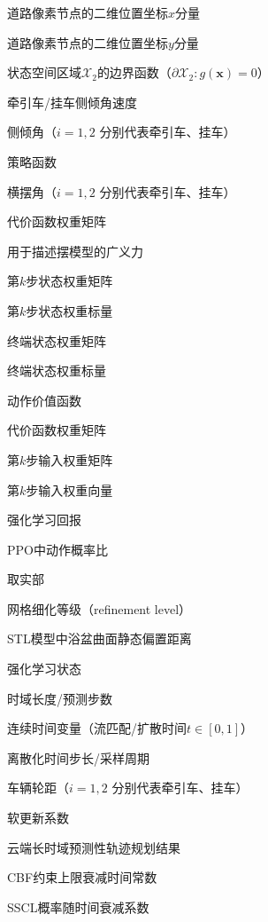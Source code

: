\begin{denotation}[3cm]
  \item[{$p_x$}] 道路像素节点的二维位置坐标$x$分量
  \item[{$p_y$}] 道路像素节点的二维位置坐标$y$分量
  \item[{$\partial \mathcal{X}_2$}] 状态空间区域$\mathcal{X}_2$的边界函数（$\partial \mathcal{X}_2: g(\bm{x}) = 0$）
  \item[{$\dot{\phi}_1,\dot{\phi}_2$}] 牵引车/挂车侧倾角速度
  \item[{$\phi_i$}] 侧倾角（$i=1,2$ 分别代表牵引车、挂车）
  \item[{$\pi_{\bm{\theta}}$}] 策略函数
  \item[{$\psi_i$}] 横摆角（$i=1,2$ 分别代表牵引车、挂车）
  \item[{$Q$}] 代价函数权重矩阵
  \item[{$Q_i$}] 用于描述摆模型的广义力
  \item[{$Q_k$}] 第$k$步状态权重矩阵
  \item[{$q_k$}] 第$k$步状态权重标量
  \item[{$Q_{N_p}$}] 终端状态权重矩阵
  \item[{$q_{N_p}$}] 终端状态权重标量
  \item[{$Q_{\bm{\theta}}(s,a)$}] 动作价值函数
  \item[{$R$}] 代价函数权重矩阵
  \item[{$R_k$}] 第$k$步输入权重矩阵
  \item[{$r_k$}] 第$k$步输入权重向量
  \item[{$r_t$}] 强化学习回报
  \item[{$r_t(\bm{\theta})$}] PPO中动作概率比
  \item[{$\mathrm{Re}(\cdot)$}] 取实部
  \item[{$\text{rf}$}] 网格细化等级（refinement level）
  \item[$s_{dev}$] STL模型中浴盆曲面静态偏置距离
  \item[{$s_t$}] 强化学习状态
  \item[{$T$}] 时域长度/预测步数
  \item[$t$] 连续时间变量（流匹配/扩散时间$t\in[0,1]$）
  \item[{$T_s$}] 离散化时间步长/采样周期
  \item[{$T_{wi}$}] 车辆轮距（$i=1,2$ 分别代表牵引车、挂车）
  \item[{$\tau$}] 软更新系数
  \item[{$\tau_{cloud}$}] 云端长时域预测性轨迹规划结果
  \item[{$\tau_{decay}$}] CBF约束上限衰减时间常数
  \item[{$\tau_{SSCL}$}] SSCL概率随时间衰减系数

\end{denotation}
